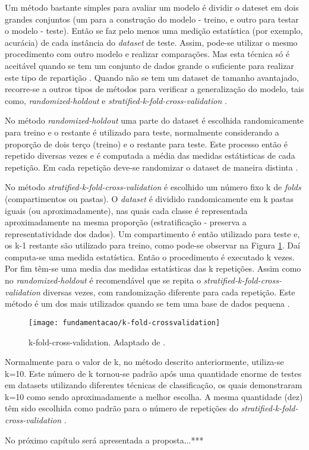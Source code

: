 Um método bastante simples para avaliar um modelo é dividir o dateset em dois grandes conjuntos (um para a construção do modelo - treino, e outro para testar o modelo - teste). Então se faz pelo menos uma medição estatística (por exemplo, acurácia) de cada instância do \textit{dataset} de teste. Assim, pode-se utilizar o mesmo procedimento com outro modelo e realizar comparações. Mas esta técnica só é aceitável quando se tem um conjunto de dados grande o suficiente para realizar este tipo de repartição \cite{Kotsiantis:2007}. Quando não se tem um dataset de tamanho avantajado, recorre-se a outros tipos de métodos para verificar a generalização do modelo, tais como, \textit{randomized-holdout} e \textit{stratified-k-fold-cross-validation} \cite{Witten:2005}.

No método \textit{randomized-holdout} uma parte do dataset é escolhida randomicamente para treino e o restante é utilizado para teste, normalmente considerando a proporção de dois terço (treino) e o restante para teste. Este processo então é repetido diversas vezes e é computada a média das medidas estátisticas de cada repetição. Em cada repetição deve-se randomizar o dataset de maneira distinta \cite{Witten:2005}.

No método \textit{stratified-k-fold-cross-validation} é escolhido um número fixo k de \textit{folds} (compartimentos ou pastas). O \textit{dataset} é dividido randomicamente em k pastas iguais (ou aproximadamente), nas quais cada classe é representada aproximadamente na mesma proporção (estratificação - preserva a representatividade dos dados). 
Um compartimento é então utilizado para teste e, os k-1 restante são utilizado para treino, como pode-se observar na Figura \ref{fig:kfoldcrossvalidation}. Daí computa-se uma medida estatística. Então o procedimento é executado k vezes. Por fim têm-se uma media das medidas estatísticas das k repetições. Assim como no \textit{randomized-holdout} é recomendável que se repita o \textit{stratified-k-fold-cross-validation} diversas vezes, com randomização diferente para cada repetição. Este método é um dos mais utilizados quando se tem uma base de dados pequena \cite{Witten:2005}.

\begin{figure}[!htb] \centering 
  \centering
  \texttt{[image: fundamentacao/k-fold-crossvalidation]} 
  \caption{k-fold-cross-validation. Adaptado de \cite{Olson:2008}.} 
  \label{fig:kfoldcrossvalidation}
\end{figure}

Normalmente para o valor de k, no método descrito anteriormente, utiliza-se k=10. Este número de k tornou-se padrão após uma quantidade enorme de testes em datasets utilizando diferentes técnicas de classificação, os quais demonstraram k=10 como sendo aproximadamente a melhor escolha. A mesma quantidade (dez) têm sido escolhida como padrão para o número de repetições do \textit{stratified-k-fold-cross-validation} \cite{Witten:2005}.

No próximo capítulo será apresentada a proposta...***
